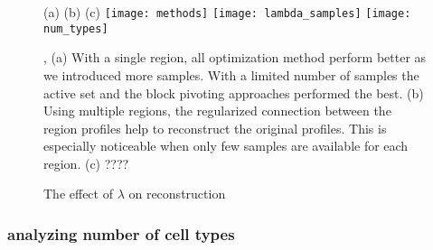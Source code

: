 \begin{figure}[!hbt]
   (a) \hspace{120pt}(b) \hspace{120pt}(c) \hspace{120pt}
   \centering
     \texttt{[image: methods]}
     \texttt{[image: lambda\_samples]}
     \texttt{[image: num\_types]}
    \caption{The effect of $\lambda$ on reconstruction}, 
    (a)  With a single region, all optimization method perform better as we introduced more samples. With a limited number of samples the active set and the block pivoting approaches performed the best. (b) Using multiple regions, the regularized connection between the region profiles help to reconstruct the original profiles. This is especially noticeable when only few samples are available for each region. (c) ????
    \label{fig:controlled_exp}
\end{figure}




\subsubsection*{analyzing number of cell types}





